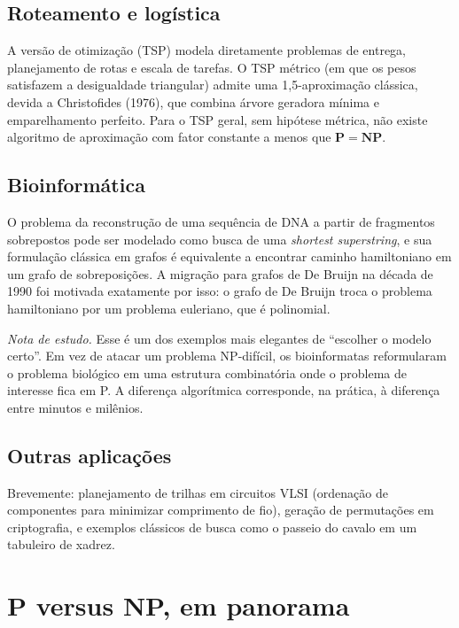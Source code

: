 \documentclass[11pt,a4paper]{article}
\theoremstyle{definition}
\newcommand{\nota}[1]{%
  \par\medskip
  {\small\color{notagray}\textit{Nota de estudo.} #1}\par\medskip
}
\begin{document}
\subsection{Roteamento e logística}

A versão de otimização (TSP) modela diretamente problemas de entrega, planejamento de rotas e escala de tarefas. O TSP métrico (em que os pesos satisfazem a desigualdade triangular) admite uma 1{,}5-aproximação clássica, devida a Christofides (1976), que combina árvore geradora mínima e emparelhamento perfeito. Para o TSP geral, sem hipótese métrica, não existe algoritmo de aproximação com fator constante a menos que $\mathbf{P} = \mathbf{NP}$.

\subsection{Bioinformática}

O problema da reconstrução de uma sequência de DNA a partir de fragmentos sobrepostos pode ser modelado como busca de uma \emph{shortest superstring}, e sua formulação clássica em grafos é equivalente a encontrar caminho hamiltoniano em um grafo de sobreposições. A migração para grafos de De Bruijn na década de 1990 foi motivada exatamente por isso: o grafo de De Bruijn troca o problema hamiltoniano por um problema euleriano, que é polinomial.

\nota{Esse é um dos exemplos mais elegantes de ``escolher o modelo certo''. Em vez de atacar um problema NP-difícil, os bioinformatas reformularam o problema biológico em uma estrutura combinatória onde o problema de interesse fica em P. A diferença algorítmica corresponde, na prática, à diferença entre minutos e milênios.}

\subsection{Outras aplicações}

Brevemente: planejamento de trilhas em circuitos VLSI (ordenação de componentes para minimizar comprimento de fio), geração de permutações em criptografia, e exemplos clássicos de busca como o passeio do cavalo em um tabuleiro de xadrez.

\section{P versus NP, em panorama}
\end{document}
